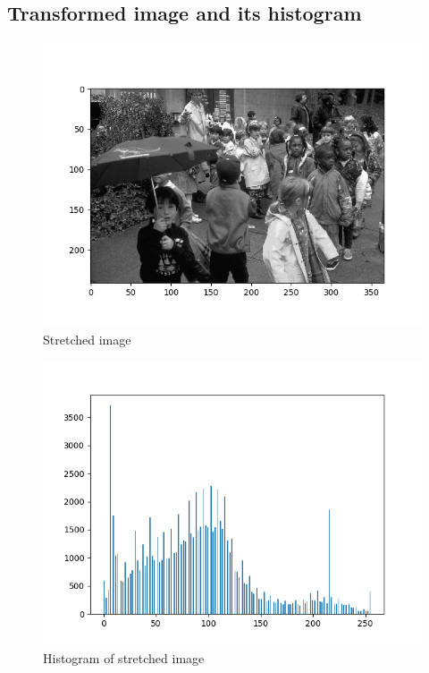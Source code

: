 \documentclass{article}
\begin{document}
\subsection{Transformed image and its histogram}
\begin{figure}[H]
    \centering
    \includegraphics[width=1\textwidth]{../kids-stretched.png}
    \caption{Stretched image}
\end{figure}
\begin{figure}[H]
    \centering
    \includegraphics[width=1\textwidth]{../kids-stretched-histogram.png}
    \caption{Histogram of stretched image}
\end{figure}
\end{document}
